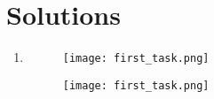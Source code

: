 \documentclass{article}
\begin{document}

\section*{Solutions}
\begin{enumerate}
    \item \begin{figure}[t]
        \centering
        \texttt{[image: first\_task.png]} %
    \end{figure}
    \begin{figure}[t]
        \centering
        \texttt{[image: first\_task.png]} %
    \end{figure}
\end{enumerate}
\end{document}
